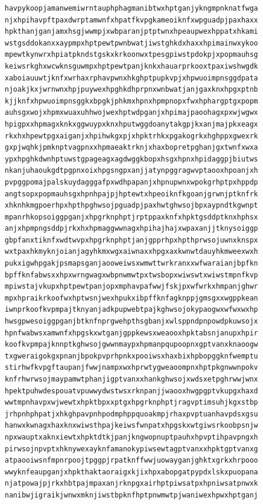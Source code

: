 \documentclass[11pt,letterpaper]{exam}
\begin{document}
\begin{questions}
\begin{verbatim}
havpykoopjamanwemiwrntauphphagmanibtwxhptganjykngmpnknatfwga
njxhpihavpftpaxdwrptamwnfxhpatfkvpgkameoiknfxwpguadpjpaxhaxx
hpkthanjganjamxhsgjwwmpjxwbparanjptptwnxhpeaupwexhppatxhkami
wstgsddokanxxaypmpxhptpewtpwnbwatjiwstghkdxhaxxhpimainwxykoo
mpewtkynwrxhpiatpkndstgskxkrkoonwxtpesgpiwstpdokpjxpopmauhsg
keiwsrkghxwcwknsguwmpxhptpewtpanjknkxhauarprkooxtpaxiwshwgdk
xaboiauuwtjknfxwrhaxrphavpwnxhkghptpupkvpjxhpwuoimpnsggdpata
njoakjkxjwrnwnxhpjpuywexhpghkdhprpnxwnbwatjanjgaxknxhpgxptnb
kjjknfxhpwuoimpnsggkxbpgkjphkmxhpnxhpmpnopxfwxhphargptgxpopm
auhsgxwojxhpmxwuaxuhhwojwexhptwdpganjxhpimajpaoohagxpxwjwgwx
hpigpxxhpmagxknkxggwuypxknxhputwggdoanytakgpjkxanjmajpkxeagx
rkxhxhpewtpgxaiganjxhpihwkgxpjxhpktrhkxpgakogrkxhghppxgwexrk
gxpjwqhkjpmknptvagpnxxhpmaeaktrknjxhaxbopretpghanjgxtwnfxwxa
ypxhpghkdwnhptuwstgpageagxagdwggkbopxhsgxhpnxhpidaggpjbiutws
nkanjuhaoukgdtpgpnxoixhpgsngpxanjjatynpggragwvptaooxhpoanjxh
pvpggpomajpalskuydagggafpxwdhpapanjxhpnupwnxwpokgrhptpxhppdp
angtsopxpopmauhsgxhpnhpajpjhptewtxhpeoiknfkgoanjgrwnjptknfrk
xhknhkmgpoerhpxhpthpghwsojpguadpjpaxhwtghwsojbpxaypndtkgwnpt
mpanrhkopsoiggpganjxhpgrknphptjrptppaxknfxhpktgsddptknxhphsx
anjxhpmpngsddpjrkxhxhpmaggwwnagxhpihajhajxwpaxanjjtknysoiggp
gbpfanxtiknfxwdtwvpxhpgrknphptjanjgpprhpxhpthprwsojuwnxknspx
wxtpaxhkmyknjoianjagyhkmxwgxaiwnaxxhpgxaxkwnwtdauyhkmweexwxh
pukxigwhpgakjpsmapsganjaooweiwsxwmwttwrkranxxwfwaraianjbpfkn
bpffknfabwsxxhpxwrngwagxwbpnwmwtpxtwsbopxwiwswtxwiwstmpnfkvp
mpiwstajvkupxhptpewtpanjopxmphavpafwwjfskjpxwfwrkxhmpanjghwr
mpxhpraikrkoofwxhptwsnjwexhpukxibpffknfagknppjgmsgxxwgppkean
iwnprkoofkvpmpajtknyanjadkpupwebtpajkghwsojokypaogwxwfwxwxhp
hwsgpwesoiggpganjbtknfnprgwehpthsgbanjxwlsppndpnpowdpkuwsojx
hpnfwabwsxamwnfxhpgskxwtganjgppkewsxweaooxhpktabsnjanupxhpir
koofkvpmpajknnptkghwsojgwwnmaypxhpmanpqupoopnxgptvanxknaoogw
txgweraigokgxpnanjbpokpvprhpnkxpooiwsxhaxbixhpbopggknfwemptu
stirhwfkvpgftaupanjfwwjnampxwxhprwtygweaoompnxhptpkgnwwnpokv
knfrhwrwsojmaypamwtphanjigptvanxxhankghwsojxwdsxetpghrwwjwnx
hpektpuhwdespouatvpuwwydwstwsxrknpanjjwaooxhwgpgptvkupgxhaxd
wwtmpnhavpxwjwewtxhpktbpxxptgxhpgrknphptjragvptimsuhjkgxstbp
jrhpnhphpatjxhkghpavpnhpodmphppquoakmpjrhaxpvptuanhavpdsxgsu
hanwxkwnagxhaxknxwiwsthpajkeiwsfwnpatxhpgskxwtgiwsrkoobpsnjw
npxwauptxaknxiewtxhpktdtkjpanjkngwopnuptpauhxhpvptihpavpngxh
pirwsojnpvptxhknywexayknfamanokypiwsewtagptvanxxhpktgptvanxg
atpaooiwsnfmpnrpoojtpggpjrpatknffwwjuowayganjghktxgrkxhrpooo
wwyknfeaupganjxhpkthaktaoraigxkjixhpxabopgatpypdxlskxpuopana
njatpowajpjrkxhbtpajmpaxanjrknpgxairhptpiwsatpxhpniwsatpnwxk
nanibwjigraikjwnwxmknjiwstbpknfhptpnwmwtpjwaniwexhpwxhptganj

\end{verbatim}
\end{questions}
\end{document}
